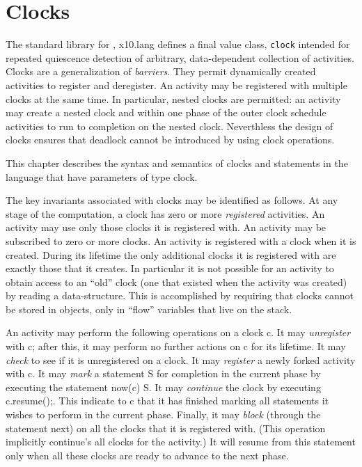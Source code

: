 \chapter{Clocks}\label{XtenClocks}

The standard library for \Xten{}, {\cf x10.lang} defines a {\cf final
value class}, {\tt clock} intended for repeated quiescence detection
of arbitrary, data-dependent collection of activities. Clocks are a
generalization of {\em barriers}. They permit dynamically created
activities to register and deregister. An activity may be registered
with multiple clocks at the same time. In particular, nested clocks
are permitted: an activity may create a nested clock and within one
phase of the outer clock schedule activities to run to completion on
the nested clock.  Neverthless the design of clocks ensures that
deadlock cannot be introduced by using clock operations.

This chapter describes the syntax and semantics of clocks and
statements in the language that have parameters of type {\cf clock}. 

The key invariants associated with clocks may be identified as
follows.  At any stage of the computation, a clock has zero or more
{\em registered} activities. An activity may use only those clocks it
is registered with. An activity may be subscribed to zero or more
clocks. An activity is registered with a clock when it is created.
During its lifetime the only additional clocks it is registered with
are exactly those that it creates. In particular it is not possible
for an activity to obtain access to an ``old'' clock (one that existed
when the activity was created) by reading a data-structure. This is
accomplished by requiring that clocks cannot be stored in objects,
only in ``flow'' variables that live on the  stack.

An activity may perform the following operations on a clock {\cf
c}. It may {\em unregister} with {\cf c}; after this, it may perform
no further actions on {\cf c} for its lifetime. It may {\em check} to
see if it is unregistered on a clock. It may {\em register} a newly
forked activity with {\cf c}.  It may {\em mark} a statement {\cf S}
for completion in the current phase by executing the statement {\cf
now(c) S}. It may {\em continue} the clock by executing {\cf
c.resume();}. This indicate to {\cf c} that it has finished marking
all statements it wishes to perform in the current phase. Finally, it
may {\em block} (through the statement {\cf next}) on all the clocks
that it is registered with. (This operation implicitly {\cf
continue}'s all clocks for the activity.) It will resume from this
statement only when all these clocks are ready to advance to the next
phase.

